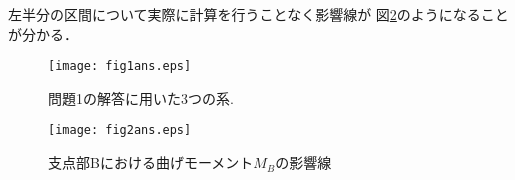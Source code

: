 ﻿\documentclass[10pt,a4j]{jarticle}
\begin{document}
左半分の区間について実際に計算を行うことなく影響線が
図\ref{fig:fig2}のようになることが分かる．
\begin{figure}[h]
	\begin{center}
	\texttt{[image: fig1ans.eps]}
	\end{center}
	\caption{問題1の解答に用いた3つの系.}
	\label{fig:fig1}
\end{figure}
\begin{figure}[h]
	\begin{center}
	\texttt{[image: fig2ans.eps]} 
	\end{center}
	\caption{支点部Bにおける曲げモーメント$M_B$の影響線}
	\label{fig:fig2}
\end{figure}
%
%
\end{document}
